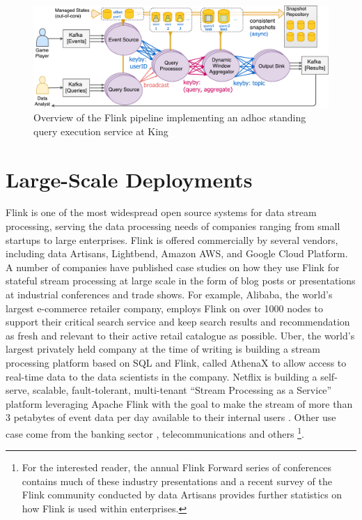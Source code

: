\begin{figure}[t]
\centering
\includegraphics[width=\textwidth]{figures/rbea.pdf}
\caption{Overview of the Flink pipeline implementing an adhoc standing query execution service at King} 
\label{fig:rbea}
\vspace{-4mm}
\end{figure}



\section{Large-Scale Deployments}
\label{sec:evaluation}

Flink is one of the most widespread open source systems for data stream processing, serving the data processing needs of companies ranging from small startups to large enterprises. Flink is offered commercially by several vendors, including data Artisans, Lightbend, Amazon AWS, and Google Cloud Platform. A number of companies have published case studies on how they use Flink for stateful stream processing at large scale in the form of blog posts or presentations at industrial conferences and trade shows. For example, {Alibaba}, the world's largest e-commerce retailer company, employs Flink on over 1000 nodes to support their critical search service \cite{CUSTOM:web/alibaba} and keep search results and recommendation as fresh and relevant to their active retail catalogue as possible. {Uber}, the world's largest privately held company at the time of writing is building a stream processing platform based on SQL and Flink, called {AthenaX} \cite{CUSTOM:web/uber} to allow access to real-time data to the data scientists in the company. {Netflix} is building a self-serve, scalable, fault-tolerant, multi-tenant “Stream Processing as a Service” platform leveraging Apache Flink with the goal to make the stream of more than 3 petabytes of event data per day available to their internal users \cite{CUSTOM:web/netflix}. Other use case come from the banking sector \cite{CUSTOM:web/ing}, telecommunications \cite{CUSTOM:web/bouygues} and others \footnote{For the interested reader, the annual Flink Forward series of conferences contains much of these industry presentations \cite{CUSTOM:web/flinkforward} and a recent survey of the Flink community conducted by data Artisans \cite{CUSTOM:web/dartisanssurvey} provides further statistics on how Flink is used within enterprises.}. 

